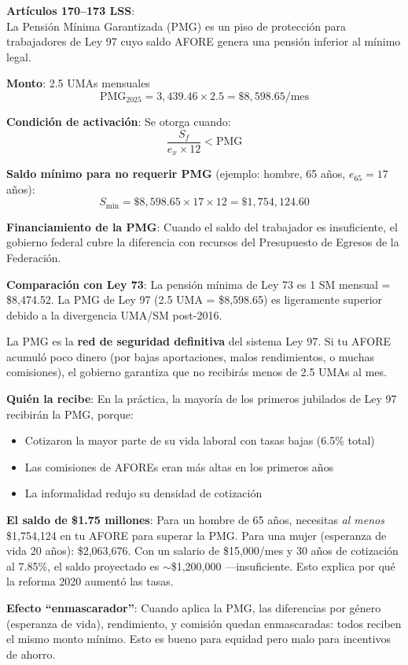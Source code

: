 \documentclass[11pt,a4paper]{report}
\begin{document}
\begin{tcolorbox}[colback=blue!5!white, colframe=blue!75!black, title=\textbf{Definici\'on Formal}]
\textbf{Art\'iculos 170--173 LSS}:\\[0.3em]
La Pensi\'on M\'inima Garantizada (PMG) es un piso de protecci\'on para trabajadores de Ley 97 cuyo saldo AFORE genera una pensi\'on inferior al m\'inimo legal.

\textbf{Monto}: 2.5 UMAs mensuales
\[
\text{PMG}_{2025} = 3{,}439.46 \times 2.5 = \$8{,}598.65/\text{mes}
\]

\textbf{Condici\'on de activaci\'on}: Se otorga cuando:
\[
\frac{S_f}{e_x \times 12} < \text{PMG}
\]

\textbf{Saldo m\'inimo para no requerir PMG} (ejemplo: hombre, 65 a\~nos, $e_{65} = 17$ a\~nos):
\[
S_{\min} = \$8{,}598.65 \times 17 \times 12 = \$1{,}754{,}124.60
\]

\textbf{Financiamiento de la PMG}: Cuando el saldo del trabajador es insuficiente, el gobierno federal cubre la diferencia con recursos del Presupuesto de Egresos de la Federaci\'on.

\textbf{Comparaci\'on con Ley 73}: La pensi\'on m\'inima de Ley 73 es 1 SM mensual = \$8,474.52. La PMG de Ley 97 (2.5 UMA = \$8,598.65) es ligeramente superior debido a la divergencia UMA/SM post-2016.
\end{tcolorbox}

\begin{tcolorbox}[colback=green!5!white, colframe=green!50!black, title=\textbf{Intuici\'on}]
La PMG es la \textbf{red de seguridad definitiva} del sistema Ley 97. Si tu AFORE acumul\'o poco dinero (por bajas aportaciones, malos rendimientos, o muchas comisiones), el gobierno garantiza que no recibir\'as menos de 2.5 UMAs al mes.

\textbf{Qui\'en la recibe}: En la pr\'actica, la mayor\'ia de los primeros jubilados de Ley 97 recibir\'an la PMG, porque:
\begin{itemize}[nosep]
\item Cotizaron la mayor parte de su vida laboral con tasas bajas (6.5\% total)
\item Las comisiones de AFOREs eran m\'as altas en los primeros a\~nos
\item La informalidad redujo su densidad de cotizaci\'on
\end{itemize}

\textbf{El saldo de \$1.75 millones}: Para un hombre de 65 a\~nos, necesitas \emph{al menos} \$1,754,124 en tu AFORE para superar la PMG. Para una mujer (esperanza de vida 20 a\~nos): \$2,063,676. Con un salario de \$15,000/mes y 30 a\~nos de cotizaci\'on al 7.85\%, el saldo proyectado es $\sim$\$1,200,000 ---insuficiente. Esto explica por qu\'e la reforma 2020 aument\'o las tasas.

\textbf{Efecto ``enmascarador''}: Cuando aplica la PMG, las diferencias por g\'enero (esperanza de vida), rendimiento, y comisi\'on quedan enmascaradas: todos reciben el mismo monto m\'inimo. Esto es bueno para equidad pero malo para incentivos de ahorro.
\end{tcolorbox}
\end{document}
